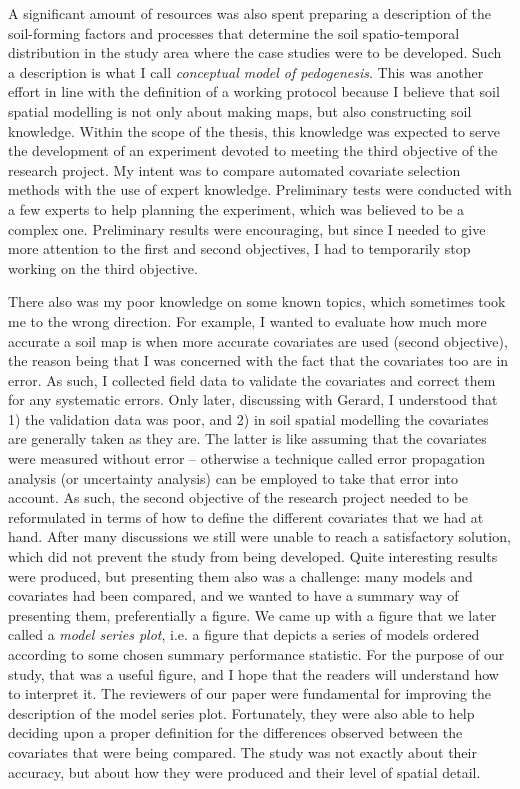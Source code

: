 A significant amount of resources was also spent preparing a description of the soil-forming factors and 
processes that determine the soil spatio-temporal distribution in the study area where the case studies were to 
be developed. Such a description is what I call \emph{conceptual model of pedogenesis}. This was another effort 
in line with the definition of a working protocol because I believe that soil spatial modelling is not only 
about making maps, but also constructing soil knowledge. Within the scope of the thesis, this knowledge was 
expected to serve the development of an experiment devoted to meeting the third objective of the research 
project. My intent was to compare automated covariate selection methods with the use of expert knowledge. 
Preliminary tests were conducted with a few experts to help planning the experiment, which was believed to be a 
complex one. Preliminary results were encouraging, but since I needed to give more attention to the first and 
second objectives, I had to temporarily stop working on the third objective.

There also was my poor knowledge on some known topics, which sometimes took me to the wrong direction. For 
example, I wanted to evaluate how much more accurate a soil map is when more accurate covariates are used 
(second objective), the reason being that I was concerned with the fact that the covariates too are in error. 
As such, I collected field data to validate the covariates and correct them for any systematic errors. Only 
later, discussing with Gerard, I understood that 1) the validation data was poor, and 2) in soil spatial 
modelling the covariates are generally taken as they are. The latter is like assuming that the covariates were 
measured without error -- otherwise a technique called error propagation analysis (or uncertainty analysis) can 
be employed to take that error into account. As such, the second objective of the research project needed to be 
reformulated in terms of how to define the different covariates that we had at hand. After many discussions we 
still were unable to reach a satisfactory solution, which did not prevent the study from being developed. Quite 
interesting results were produced, but presenting them also was a challenge: many models and covariates had 
been compared, and we wanted to have a summary way of presenting them, preferentially a figure. We came up with 
a figure that we later called a \emph{model series plot}, i.e. a figure that depicts a series of models ordered 
according to some chosen summary performance statistic. For the purpose of our study, that was a useful figure, 
and I hope that the readers will understand how to interpret it. The reviewers of our paper were fundamental 
for improving the description of the model series plot. Fortunately, they were also able to help deciding upon 
a proper definition for the differences observed between the covariates that were being compared. The study was 
not exactly about their accuracy, but about how they were produced and their level of spatial detail.

